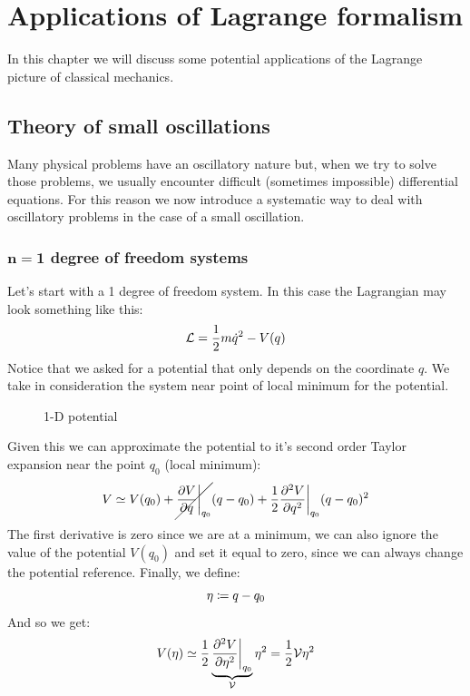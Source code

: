 \chapter[Lagrange formalism applied]{Applications of Lagrange formalism}
In this chapter we will discuss some potential applications of the Lagrange picture of classical mechanics.
\section{Theory of small oscillations}
Many physical problems have an oscillatory nature but, when we try to solve those problems, we usually encounter difficult (sometimes impossible) differential equations.
For this reason we now introduce a systematic way to deal with oscillatory problems in the case of a small oscillation.
\subsection{$\mathbf{n = 1}$ degree of freedom systems}
Let's start with a 1 degree of freedom system. In this case the Lagrangian may look something like this:
\begin{equation}
    \mathcal{L} = \dfrac{1}{2}m\dot{q}^2 - V(q)
\end{equation}
Notice that we asked for a potential that only depends on the coordinate $q$.
We take in consideration the system near point of local minimum for the potential.
\begin{figure}[!ht]
    \centering
    
    \caption{1-D potential}
    \label{fig:image10}
\end{figure}
Given this we can approximate the potential to it's second order Taylor expansion near the point $q_0$ (local minimum):
\begin{equation}
    V \simeq V(q_0) + \cancel{\pdv{V}{q}\bigg|_{q_0}}(q-q_0) + \dfrac{1}{2}\pdv[2]{V}{q}\bigg|_{q_0}(q-q_0)^2
\end{equation}
The first derivative is zero since we are at a minimum, we can also ignore the value of the potential $V(q_0)$ and set it equal to zero, since we can always change the potential reference. Finally, we define:
\begin{equation}
    \eta \coloneqq q-q_0
\end{equation}
And so we get:
\begin{equation} \label{e:potential_1D_oscillation}
    V(\eta) \simeq \dfrac{1}{2}\underbrace{\pdv[2]{V}{\eta}\bigg|_{q_0}}_{\Velegant}\eta^2 = \dfrac{1}{2}\Velegant\eta^2
\end{equation}
